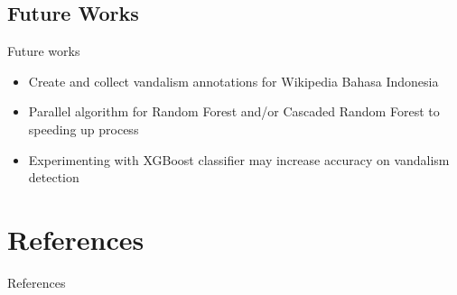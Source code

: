 \documentclass{beamer}
\begin{document}
\subsection{Future Works}
\begin{frame}
	{Future works}
	\begin{itemize}
		\item Create and collect vandalism annotations for Wikipedia Bahasa
		Indonesia
		\item Parallel algorithm for Random Forest and/or Cascaded Random
		Forest to speeding up process
		\item Experimenting with XGBoost classifier may increase accuracy on
		vandalism detection
	\end{itemize}
\end{frame}

\section*{References}

\begin{frame}{References}
\printbibliography
\end{frame}
\end{document}
